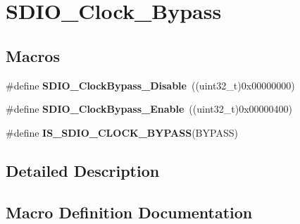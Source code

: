 \hypertarget{group___s_d_i_o___clock___bypass}{}\section{S\+D\+I\+O\+\_\+\+Clock\+\_\+\+Bypass}
\label{group___s_d_i_o___clock___bypass}
\subsection*{Macros}
\begin{DoxyCompactItemize}
\item 
\hypertarget{group___s_d_i_o___clock___bypass_gacc168d55136a0c6575e5afd7a6550343}{}\#define {\bfseries S\+D\+I\+O\+\_\+\+Clock\+Bypass\+\_\+\+Disable}~((uint32\+\_\+t)0x00000000)\label{group___s_d_i_o___clock___bypass_gacc168d55136a0c6575e5afd7a6550343}

\item 
\hypertarget{group___s_d_i_o___clock___bypass_ga5e1e9f7e05ea62dd2315eb556bc10e5c}{}\#define {\bfseries S\+D\+I\+O\+\_\+\+Clock\+Bypass\+\_\+\+Enable}~((uint32\+\_\+t)0x00000400)\label{group___s_d_i_o___clock___bypass_ga5e1e9f7e05ea62dd2315eb556bc10e5c}

\item 
\#define {\bfseries I\+S\+\_\+\+S\+D\+I\+O\+\_\+\+C\+L\+O\+C\+K\+\_\+\+B\+Y\+P\+A\+S\+S}(B\+Y\+P\+A\+S\+S)
\end{DoxyCompactItemize}


\subsection{Detailed Description}


\subsection{Macro Definition Documentation}
\hypertarget{group___s_d_i_o___clock___bypass_ga5d5a2fcdd3150e4a89c5aa1efd738dec}{}
